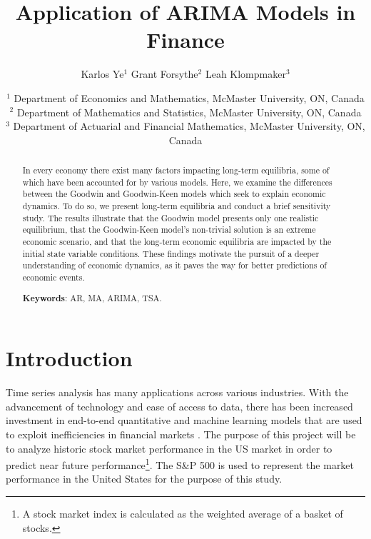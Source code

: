 \documentclass[12pt, centerh1]{article}
\title{Application of ARIMA Models in Finance} %
\author{\qquad Karlos Ye$^{1}$ \qquad Grant Forsythe$^{2}$ \qquad Leah Klompmaker$^{3}$}
\date{
{\footnotesize $^1$ Department of Economics and Mathematics, McMaster University, ON, Canada\\[-6pt]
               $^2$ Department of Mathematics and Statistics, McMaster University, ON, Canada\\[-6pt]
               $^3$ Department of Actuarial and Financial Mathematics, McMaster University, ON, Canada\\[-6pt]}
}
\begin{document}
\maketitle
\vspace{-8mm} %
\begin{abstract}
In every economy there exist many factors impacting long-term equilibria, some of which have been accounted for by various models. 
Here, we examine the differences between the Goodwin and Goodwin-Keen models which seek to explain economic dynamics. To do so, we present long-term equilibria and conduct a brief sensitivity study. The results illustrate that the Goodwin model presents only one realistic equilibrium, that the Goodwin-Keen model's non-trivial solution is an extreme economic scenario, and that the long-term economic equilibria are impacted by the initial state variable conditions. These findings motivate the pursuit of a deeper understanding of economic dynamics, as it paves the way for better predictions of economic events.

\noindent\textbf{Keywords}: AR, MA, ARIMA, TSA.


\end{abstract}
\newpage

\section{Introduction} \label{introduction}
Time series analysis has many applications across various industries. With the advancement of technology and ease of access to data, there has been increased investment in end-to-end quantitative and machine learning models that are used to exploit inefficiencies in financial markets \citep{coqueret2021machine}. The purpose of this project will be to analyze historic stock market performance in the US market in order to predict near future performance\footnote{A stock market index is calculated as the weighted average of a basket of stocks.}. The S\&P 500 is used to represent the market performance in the United States for the purpose of this study. 
\end{document}
